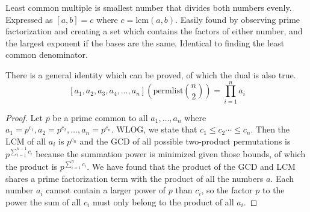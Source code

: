 Least common multiple is smallest number that divides both numbers evenly.
Expressed as $[a,b]=c$ where $c=\mathrm{lcm}(a,b)$. Easily found by observing prime factorization
and creating a set which contains the factors of either number, and the largest exponent if the bases are the same.
Identical to finding the least common denominator.

There is a general identity which can be proved, of which the dual is also true.
\begin{equation*}
    \left[a_1,a_2,a_3,a_4,\ldots,a_n\right]\left(\mathrm{permlist}{n\choose 2}\right) = \prod_{i = 1}^n a_i
\end{equation*}
\begin{proof}
    Let $p$ be a prime common to all $a_1,\ldots,a_n$ where $a_1=p^{c_1},a_2=p^{c_2},\ldots,a_n=p^{c_n}$. WLOG, we state that $c_1\leq c_2\cdots \leq c_n$.
    Then the LCM of all $a_i$ is $p^{c_n}$ and the GCD of all possible two-product permutations is $p^{\sum_{i=1}^{n-1} c_i}$ because the summation power is minimized given those bounds, of which the product is
    $p^{\sum_{i=1}^n c_i}$. We have found that the product of the GCD and LCM shares a prime factorization term with the product of all the numbers $a$. Each number $a_i$ cannot contain a larger power of $p$ than $c_i$, so the factor $p$ to the power the sum of all $c_i$
    must only belong to the product of all $a_i$.
\end{proof}